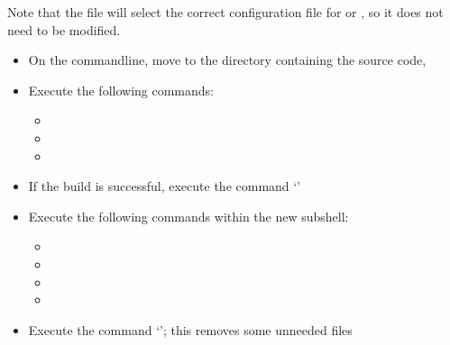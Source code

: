 Note that the file  will select the correct
configuration file for \osx{} or \win{}, so it does not need to be modified.
\begin{itemize}
\item On the command\longDash{}line, move to the directory containing the \mplusm{} source
code, 
\item\exSp{}Execute the following commands:
\begin{itemize}
\item {}
\item\exSp{}
\item\exSp{}
\end{itemize}
\item\exSp{}If the build is successful, execute the command `'
\item\exSp{}Execute the following commands within the new subshell:
\begin{itemize}
\item {}
\item\exSp{}
\item\exSp{}
\item\exSp{}
\end{itemize}
\item\exSp{}Execute the command `'; this removes some
unneeded files
\end{itemize}
\tertiaryEnd
{}
